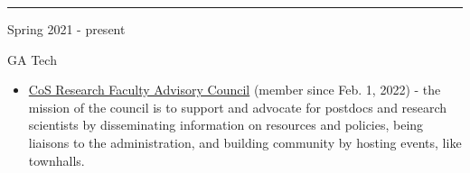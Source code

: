\documentclass[a4paper,10pt]{article}
\newlength{\cvcolumngapwidth}
\newlength{\cvleftcolumnwidth}
\newlength{\cvrightcolumnwidth}
\newcommand{\cvsectionstyle}[1]{{\normalsize\cvsectionfont\textcolor{cvsectioncolor}{#1}}}
\newcommand{\cvtitlestyle}[1]{{\large\cvtitlefont\textcolor{cvtitlecolor}{#1}}}
\newcommand{\cvheadingstyle}[1]{{\normalsize\cvheadingfont\textcolor{cvheadingcolor}{#1}}}
\newlength{\cvafteritemskipamount}
\newlength{\cvaftersectionskipamount}
\newlength{\cvbetweensectionandheadingextraskipamount}
\newlength{\cvaftertitleskipamount}
\newlength{\cvparskip}
\newcommand{\cvsection}[1]{
            \begin{minipage}[t]{\cvleftcolumnwidth}
                \raggedleft\cvsectionstyle{#1}
            \end{minipage}%
            \hspace{\cvcolumngapwidth}%
            \begin{minipage}[t]{\cvrightcolumnwidth}
                \textcolor{cvrulecolor}{\rule{\cvrightcolumnwidth}{0.3mm}}
            \end{minipage}
        
            \vspace{\cvaftersectionskipamount}
        }
\newcommand{\cvitem}[2]{
            \begin{minipage}[t]{\cvleftcolumnwidth}
                \raggedleft #1
            \end{minipage}%
            \hspace{\cvcolumngapwidth}%
            \begin{minipage}[t]{\cvrightcolumnwidth}
                \setlength{\parskip}{\cvparskip} #2
            \end{minipage}
        
            \vspace{\cvafteritemskipamount}
        }
\newcommand{\cvtitle}[1]{
            \cvtitlestyle{#1}
        
            \vspace{\cvaftertitleskipamount}
            \vspace{-\cvparskip}
        }
\begin{document}
%        
%        
%  
        
        \cvsection{SERVICE}
        \vspace{\cvbetweensectionandheadingextraskipamount}
        
        
    
\cvitem{
    \cvheadingstyle{Spring 2021 - present}
}{
    \cvtitle{GA Tech }
            \begin{itemize}[leftmargin=*]
            \item \href{https://rfac.cos.gatech.edu/}{CoS Research Faculty Advisory Council} (member since Feb. 1, 2022) - the mission of the council is to support and advocate for postdocs and research scientists by disseminating information on resources and policies, being liaisons to the administration, and  building community by hosting events, like townhalls.

	        \end{itemize}
	
	}
            
\end{document}
